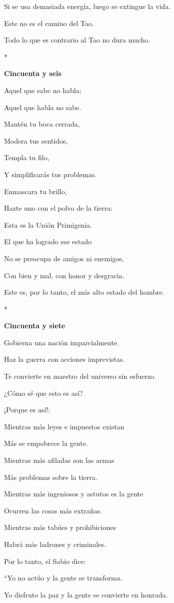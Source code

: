 Si se usa demasiada energía, luego se extingue la vida.

Este no es el camino del Tao.

Todo lo que es contrario al Tao no dura mucho.

*

\textbf{Cincuenta y seis}

Aquel que sabe no habla;

Aquel que habla no sabe.

Mantén tu boca cerrada,

Modera tus sentidos,

Templa tu filo,

Y simplificarás tus problemas.

Enmascara tu brillo,

Hazte uno con el polvo de la tierra:

Esta es la Unión Primigenia.

El que ha logrado ese estado

No se preocupa de amigos ni enemigos,

Con bien y mal, con honor y desgracia.

Este es, por lo tanto, el más alto estado del hombre.

*

\textbf{Cincuenta y siete}

Gobierna una nación imparcialmente.

Haz la guerra con acciones imprevistas.

Te convierte en maestro del universo sin esfuerzo.

¿Cómo sé que esto es así?

¡Porque es así!:

Mientras más leyes e impuestos existan

Más se empobrece la gente.

Mientras más afiladas son las armas

Más problemas sobre la tierra.

Mientras más ingeniosos y astutos es la gente

Ocurren las cosas más extrañas.

Mientras más tabúes y prohibiciones

Habrá más ladrones y criminales.

Por lo tanto, el Sabio dice:

``Yo no actúo y la gente se transforma.

Yo disfruto la paz y la gente se convierte en honrada.

